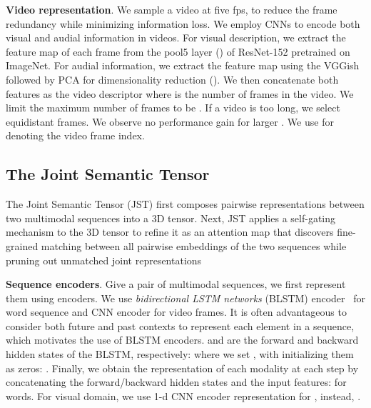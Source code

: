 \documentclass[runningheads]{llncs}
\begin{document}
\textbf{Video representation}.
We sample a video at five fps, to reduce the frame redundancy while minimizing information loss.
We employ CNNs to encode both visual and audial information in videos.
For visual description, we extract the feature map of each frame from the pool5 layer
()
of ResNet-152 \cite{he-arxiv-2015} pretrained on ImageNet. For audial information, we extract the feature map using the VGGish~\cite{Hershey-icassp-2017} followed by PCA for dimensionality reduction ().
We then concatenate both features as the video descriptor  where  is the number of frames in the video.
We limit the maximum number of frames to be .
If a video is too long, we select  equidistant frames. We observe no performance gain for larger . We use  for denoting the video frame index.


\subsection{The Joint Semantic Tensor}
\label{subsec:jst}

The Joint Semantic Tensor (JST) first composes pairwise representations between two multimodal sequences into a 3D tensor. 
Next, JST applies a self-gating mechanism to the 3D tensor to refine it as an attention map that discovers fine-grained matching between all pairwise embeddings of the two sequences while pruning out unmatched joint representations

\textbf{Sequence encoders}.
Give a pair of multimodal sequences, we first represent them using encoders.
We use \textit{bidirectional LSTM networks} (BLSTM) encoder~\cite{Schuster-ieee-1997,hochreiter-ieee-1997} for word sequence and CNN encoder for video frames.
It is often advantageous to consider both future and past contexts to represent each element in a sequence, which motivates the use of BLSTM encoders. 
 and  are the forward and backward hidden states of the BLSTM, respectively:
where we set , with initializing them as zeros: .
Finally, we obtain the representation of each modality at each step by 
concatenating the forward/backward hidden states and the input features: 
 for words.
For visual domain, we use 1-d CNN encoder representation for ,  instead, .
\end{document}
